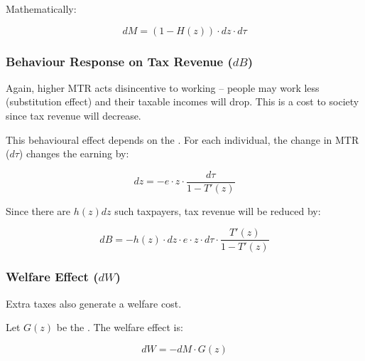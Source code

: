             Mathematically:

            \begin{equation}
                dM = (1-H(z)) \cdot dz \cdot d\tau
                \label{eqn:tax_gen_TR}
            \end{equation}

        \subsubsection{Behaviour Response on Tax Revenue ($dB$)}

            Again, higher MTR acts disincentive to working -- people may work less (substitution effect) and their taxable incomes will drop. This is a cost to society since tax revenue will decrease.

            This behavioural effect depends on the . For each individual, the change in MTR ($d\tau$) changes the earning by:

            \begin{equation*}
                dz = -e \cdot z \cdot \frac{d\tau}{1-T'(z)}
            \end{equation*}

            Since there are $h(z)dz$ such taxpayers, tax revenue will be reduced by:

            \begin{equation}
                dB = - h(z) \cdot dz \cdot e \cdot z \cdot d\tau \cdot \frac{T'(z)}{1-T'(z)}
                \label{eqn:tax_gen_BR}
            \end{equation}

        \subsubsection{Welfare Effect ($dW$)}

            Extra taxes also generate a welfare cost.

            Let $G(z)$ be the . The welfare effect is:

            \begin{equation}
                dW = - dM \cdot G(z)
                \label{eqn:tax_gen_WE}
            \end{equation}

